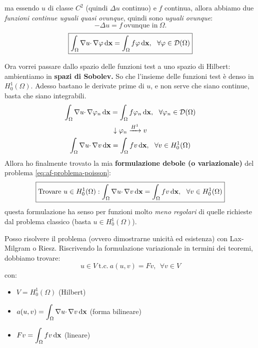 \begin{itemize}
{\begin{equation*}
              \end{equation*}
              ma essendo $u$ di classe $\displaystyle C^{2}$ (quindi $\displaystyle \Delta u$ continuo) e $f$ continua, allora abbiamo due \textit{funzioni continue uguali quasi ovunque}, quindi sono \textit{uguali ovunque}:
              \begin{equation*}
                  -\Delta u=f\ \text{ovunque in} \ \Omega .
              \end{equation*}}
          \begin{equation}
              \boxed{\int _{\Omega } \nabla u\cdotp \nabla \varphi \,\mathrm d \mathbf{x} =\int _{\Omega } f\varphi \,\mathrm d \mathbf{x} ,\ \ \forall \varphi \in \mathcal{D}(\Omega)}
          \end{equation}
\end{itemize}

Ora vorrei passare dallo spazio delle funzioni test a uno spazio di Hilbert: ambientiamo in \textbf{spazi di Sobolev. }So che l'insieme delle funzioni test è denso in $\displaystyle H_{0}^{1}(\Omega)$. Adesso bastano le derivate prime di $u$, e non serve che siano continue, basta che siano integrabili.
\begin{gather*}
    \int _{\Omega } \nabla u\cdotp \nabla \varphi _{n} \,\mathrm d \mathbf{x} =\int _{\Omega } f\varphi _{n} \,\mathrm d \mathbf{x} ,\ \ \forall \varphi _{n} \in \mathcal{D}(\Omega)\\
    \downarrow \varphi _{n}\xrightarrow{H^{1}} v\\
    \int _{\Omega } \nabla u\cdotp \nabla v\,\mathrm d \mathbf{x} =\int _{\Omega } fv\,\mathrm d \mathbf{x} ,\ \ \forall v\in H_{0}^{1}(\Omega)
\end{gather*}
Allora ho finalmente trovato la mia \textbf{formulazione debole (o variazionale)} del problema \eqref{eq:af-problema-poisson}:
\begin{equation}
    \boxed{\text{Trovare} \ u\in H_{0}^{1}(\Omega) :\int _{\Omega } \nabla u\cdotp \nabla v\,\mathrm d \mathbf{x} =\int _{\Omega } fv\,\mathrm d \mathbf{x} ,\ \ \forall v\in H_{0}^{1}(\Omega)}
\end{equation}
questa formulazione ha senso per funzioni molto \textit{meno regolari} di quelle richieste dal problema classico (basta $\displaystyle u\in H_{0}^{1}(\Omega)$).

Posso risolvere il problema (ovvero dimostrarne unicità ed esistenza) con Lax-Milgram o Riesz. Riscrivendo la formulazione variazionale in termini dei teoremi, dobbiamo trovare:
\begin{equation*}
    u\in V\ \text{t.c.} \ a(u,v) =Fv,\ \ \forall v\in V
\end{equation*}
con:
\begin{itemize}
    \item $\displaystyle V=H_{0}^{1}(\Omega)$ (Hilbert)
    \item $\displaystyle a(u,v) =\int _{\Omega } \nabla u\cdotp \nabla v\,\mathrm d \mathbf{x}$ (forma bilineare)
    \item $\displaystyle Fv=\int _{\Omega } fv\,\mathrm d \mathbf{x}$ (lineare)
\end{itemize}

